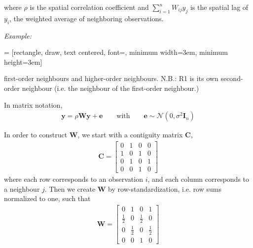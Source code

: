 \noindent where $\rho$ is the spatial correlation coefficient and $\sum_{i=1}^{n} W_{ij} y_{j}$ is the spatial lag of $y_i$, the weighted average of neighboring observations.

\emph{Example:}

 = [rectangle, draw, text centered, font=\large,
    minimum width=3em, minimum height=3em]


\noindent first-order neighbours and higher-order neighbours. N.B.: R1 is its own second-order neighbour (i.e. the neighbour of the first-order neighbour.)

In matrix notation,
\begin{eqnarray}
\boldsymbol{y} = \rho\boldsymbol{Wy} + \boldsymbol{e} \qquad \text{with} \qquad \boldsymbol{e} \sim\mathcal{N}(0,\sigma^{2}\boldsymbol{I}_n)
\end{eqnarray}

In order to construct $\boldsymbol{W}$, we start with a contiguity matrix $\boldsymbol{C}$,
\begin{eqnarray}
\boldsymbol{C} = 
\begin{bmatrix}
  0 & 1 & 0 & 0\\
  1 & 0 & 1 & 0\\
  0 & 1 & 0 & 1\\
  0 & 0 & 1 & 0
\end{bmatrix}
\end{eqnarray}
\noindent where each row corresponds to an observation $i$, and each column corresponds to a neighbour $j$. Then we create $\boldsymbol{W}$ by row-standardization, i.e. row sums normalized to one, such that
\begin{eqnarray}
\boldsymbol{W} = 
\begin{bmatrix}
  0 & 1 & 0 & 1\\
  \frac{1}{2} & 0 & \frac{1}{2} & 0\\
  0 & \frac{1}{2} & 0 & \frac{1}{2}\\
  0 & 0 & 1 & 0
\end{bmatrix}
\end{eqnarray}

